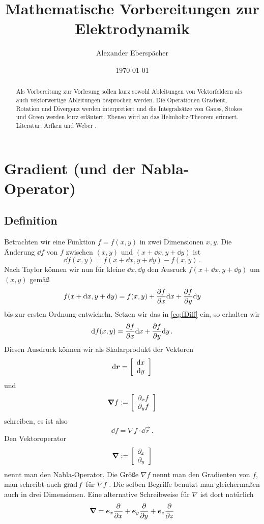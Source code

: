 \documentclass[paper=a4, fontsize=11.0pt, abstractoff, DIV12]{scrartcl}
\title{Mathematische Vorbereitungen zur Elektrodynamik}
\author{Alexander Eberspächer}
\date{\today}
\begin{document}
\maketitle
\begin{abstract}
Als Vorbereitung zur Vorlesung sollen kurz sowohl Ableitungen von
Vektorfeldern als auch vektorwertige Ableitungen besprochen werden. Die
Operationen Gradient, Rotation und Divergenz werden interpretiert und die
Integralsätze von Gauss, Stokes und Green werden kurz erläutert.
Ebenso wird an das Helmholtz-Theorem erinnert.\\[0.5ex]
Literatur: Arfken und Weber \cite{Arfken}.
\end{abstract}

\section{Gradient (und der \glqq Nabla\grqq-Operator)}

\subsection{Definition}

Betrachten wir eine Funktion $f = f(x,y)$ in zwei Dimensionen $x,y$. Die
Änderung $\dd f$ von $f$ zwischen $(x,y)$ und $(x+\dd x, y+\dd y)$ ist
\begin{equation}
\dd f(x,y) = f(x+\dd x, y+\dd y) - f(x,y)\, .
\label{eq:fDiff}
\end{equation}
Nach Taylor können wir nun für kleine $\dd x, \dd y$ den Ausruck $f(x+\dd x,
y+\dd y)$ um $(x,y)$ gemäß
\begin{equation*}
f(x+\mathrm{d} x, y+\mathrm{d} y) = f(x,y) + \frac{\partial f}{\partial x}\mathrm{d} x + \frac{\partial f}{\partial y}\mathrm{d} y
\end{equation*}
bis zur ersten Ordnung entwickeln. Setzen wir das in \eqref{eq:fDiff} ein,
so erhalten wir
\begin{equation}
\mathrm{d} f(x,y) = \frac{\partial f}{\partial x}\mathrm{d} x + \frac{\partial f}{\partial y}\mathrm{d} y\, .
\end{equation}
Diesen Ausdruck können wir als Skalarprodukt der Vektoren
\begin{equation*}
\mathrm{d} {\boldsymbol{r}} = \left[ \begin{array}{c} \mathrm{d} x \\ \mathrm{d} y \end{array} \right]
\end{equation*}
und
\begin{equation*}
\nabla f := \ZweierVec{\partial_x f}{\partial_y f}
\end{equation*}
schreiben, es ist also
\begin{equation}
\dd f = \nabla f \cdot \dd \vec r \,.
\end{equation}
Den Vektoroperator
\begin{equation}
\nabla := \ZweierVec{\partial_x}{\partial_y}
\end{equation}
nennt man den \glqq Nabla\grqq-Operator.
Die Größe $\nabla f$ nennt man den Gradienten von $f$, man schreibt auch
$\operatorname{grad} f$ für $\nabla f$ . Die selben Begriffe
benutzt man gleichermaßen auch in drei Dimensionen. Eine alternative Schreibweise
für $\nabla$ ist dort natürlich
\begin{equation*}
\nabla = \vec{e}_x \firstpderiv{}{x} + \vec{e}_y \firstpderiv{}{y} + \vec{e}_z \firstpderiv{}{z}
\end{equation*}
\end{document}
